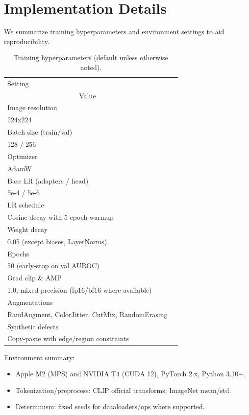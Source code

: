 \documentclass[conference]{IEEEtran}
\begin{document}
\section{Implementation Details}
We summarize training hyperparameters and environment settings to aid reproducibility.

\begin{table}[!t]
  \centering
  \caption{Training hyperparameters (default unless otherwise noted).}
  \label{tab:hparams}
  \vspace{2pt}
  \begin{tabular}{@{}ll@{}}
    \toprule
    Setting \\ \multicolumn{1}{c}{Value} \\
    \midrule
    Image resolution \\ 224x224 \\
    Batch size (train/val) \\ 128 / 256 \\
    Optimizer \\ AdamW \\
    Base LR (adapters / head) \\ 5e-4 / 5e-6 \\
    LR schedule \\ Cosine decay with 5-epoch warmup \\
    Weight decay \\ 0.05 (except biases, LayerNorms) \\
    Epochs \\ 50 (early-stop on val AUROC) \\
    Grad clip \& AMP \\ 1.0; mixed precision (fp16/bf16 where available) \\
    Augmentations \\ RandAugment, ColorJitter, CutMix, RandomErasing \\
    Synthetic defects \\ Copy-paste with edge/region constraints \\
    \bottomrule
  \end{tabular}
\end{table}

\noindent Environment summary:
\begin{itemize}
  \item Apple M2 (MPS) and NVIDIA T4 (CUDA 12), PyTorch 2.x, Python 3.10+.
  \item Tokenization/preprocess: CLIP official transforms; ImageNet mean/std.
  \item Determinism: fixed seeds for dataloaders/ops where supported.
\end{itemize}
\end{document}
